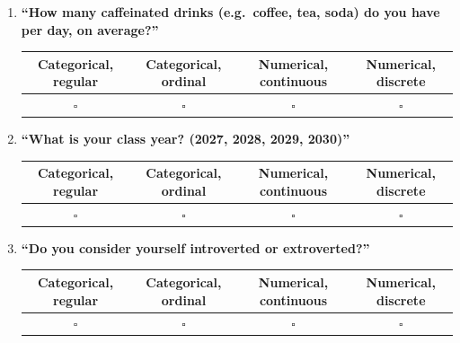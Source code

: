 \documentclass{article}
\begin{document}
\begin{enumerate}[leftmargin=*,itemsep=1.3em]

  \item \textbf{``How many caffeinated drinks (e.g.\ coffee, tea, soda) do you have per day, on average?''}

  \begin{center}
  \renewcommand{\arraystretch}{1.6}
  \begin{tabular}{|c|c|c|c|}
  \hline
  \textbf{Categorical, regular} & \textbf{Categorical, ordinal} & \textbf{Numerical, continuous} & \textbf{Numerical, discrete} \\
  \hline
  $\square$ & $\square$ & $\square$ & $\square$ \\
  \hline
  \end{tabular}
  \end{center}

  \item \textbf{``What is your class year? (2027, 2028, 2029, 2030)''}

  \begin{center}
  \renewcommand{\arraystretch}{1.6}
  \begin{tabular}{|c|c|c|c|}
  \hline
  \textbf{Categorical, regular} & \textbf{Categorical, ordinal} & \textbf{Numerical, continuous} & \textbf{Numerical, discrete} \\
  \hline
  $\square$ & $\square$ & $\square$ & $\square$ \\
  \hline
  \end{tabular}
  \end{center}

  \item \textbf{``Do you consider yourself introverted or extroverted?''}

  \begin{center}
  \renewcommand{\arraystretch}{1.6}
  \begin{tabular}{|c|c|c|c|}
  \hline
  \textbf{Categorical, regular} & \textbf{Categorical, ordinal} & \textbf{Numerical, continuous} & \textbf{Numerical, discrete} \\
  \hline
  $\square$ & $\square$ & $\square$ & $\square$ \\
  \hline
  \end{tabular}
  \end{center}

\end{enumerate}
\end{document}
